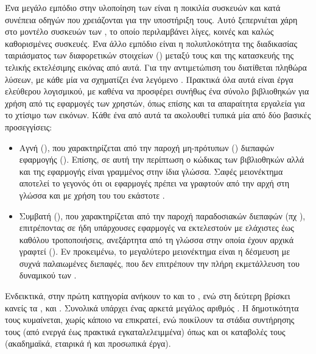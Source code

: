 Ένα μεγάλο εμπόδιο στην υλοποίηση των  είναι η ποικιλία συσκευών
και κατά συνέπεια οδηγών που χρειάζονται για την υποστήριξη τους. Αυτό
ξεπερνιέται χάρη στο μοντέλο συσκευών των , το οποίο
περιλαμβάνει λίγες, κοινές και καλώς καθορισμένες συσκευές. Ένα άλλο εμπόδιο
είναι η πολυπλοκότητα της διαδικασίας ταιριάσματος των διαφορετικών στοιχείων
() μεταξύ τους και της κατασκευής της τελικής εκτελέσιμης εικόνας
από αυτά. Για την αντιμετώπιση του διατίθεται πληθώρα λύσεων, με κάθε μία
να σχηματίζει ένα λεγόμενο . Πρακτικά όλα αυτά είναι
έργα ελεύθερου λογισμικού, με καθένα να προσφέρει συνήθως ένα σύνολο
βιβλιοθηκών για χρήση από τις εφαρμογές των χρηστών, όπως επίσης και τα
απαραίτητα εργαλεία για το χτίσιμο των εικόνων. Κάθε ένα από αυτά τα
 ακολουθεί τυπικά μία από δύο βασικές προσεγγίσεις:
\begin{itemize}
    \item Αγνή (), που χαρακτηρίζεται από την παροχή
          μη-πρότυπων () διεπαφών εφαρμογής (). Επίσης, σε
          αυτή την περίπτωση ο κώδικας των βιβλιοθηκών αλλά και της εφαρμογής
          είναι γραμμένος στην ίδια γλώσσα. Σαφές μειονέκτημα αποτελεί το
          γεγονός ότι οι εφαρμογές πρέπει να γραφτούν από την αρχή στη γλώσσα
          και με χρήση του  του εκάστοτε .
    \item Συμβατή (), που χαρακτηρίζεται από την παροχή
          παραδοσιακών διεπαφών (πχ ), επιτρέποντας σε ήδη υπάρχουσες
          εφαρμογές να εκτελεστούν με ελάχιστες έως καθόλου τροποποιήσεις,
          ανεξάρτητα από τη γλώσσα στην οποία έχουν αρχικά γραφτεί (). Εν προκειμένω, το μεγαλύτερο μειονέκτημα είναι η
          δέσμευση με συχνά παλαιωμένες διεπαφές, που δεν επιτρέπουν την πλήρη
          εκμετάλλευση του δυναμικού των .
\end{itemize}
Ενδεικτικά, στην πρώτη κατηγορία ανήκουν το  \cite{mirageos} και το
 \cite{includeos}, ενώ στη δεύτερη βρίσκει κανείς τα 
\cite{rumprun}, \osv{} \cite{osv} και  \cite{hermitux}. Συνολικά
υπάρχει ένας αρκετά μεγάλος αριθμός . Η δημοτικότητα
τους κυμαίνεται, χωρίς κάποιο να επικρατεί, ενώ ποικίλουν τα στάδια συντήρησης
τους (από ενεργά έως πρακτικά εγκαταλελειμμένα) όπως και οι καταβολές τους
(ακαδημαϊκά, εταιρικά ή και προσωπικά έργα).


